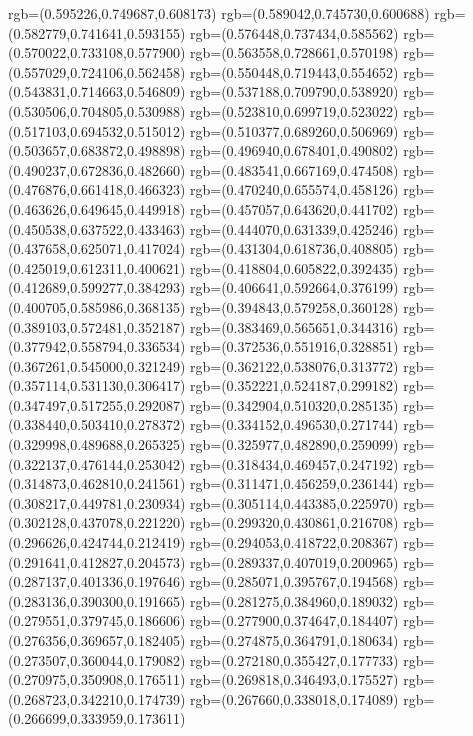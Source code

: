 {{{			rgb=(0.595226,0.749687,0.608173)
			rgb=(0.589042,0.745730,0.600688)
			rgb=(0.582779,0.741641,0.593155)
			rgb=(0.576448,0.737434,0.585562)
			rgb=(0.570022,0.733108,0.577900)
			rgb=(0.563558,0.728661,0.570198)
			rgb=(0.557029,0.724106,0.562458)
			rgb=(0.550448,0.719443,0.554652)
			rgb=(0.543831,0.714663,0.546809)
			rgb=(0.537188,0.709790,0.538920)
			rgb=(0.530506,0.704805,0.530988)
			rgb=(0.523810,0.699719,0.523022)
			rgb=(0.517103,0.694532,0.515012)
			rgb=(0.510377,0.689260,0.506969)
			rgb=(0.503657,0.683872,0.498898)
			rgb=(0.496940,0.678401,0.490802)
			rgb=(0.490237,0.672836,0.482660)
			rgb=(0.483541,0.667169,0.474508)
			rgb=(0.476876,0.661418,0.466323)
			rgb=(0.470240,0.655574,0.458126)
			rgb=(0.463626,0.649645,0.449918)
			rgb=(0.457057,0.643620,0.441702)
			rgb=(0.450538,0.637522,0.433463)
			rgb=(0.444070,0.631339,0.425246)
			rgb=(0.437658,0.625071,0.417024)
			rgb=(0.431304,0.618736,0.408805)
			rgb=(0.425019,0.612311,0.400621)
			rgb=(0.418804,0.605822,0.392435)
			rgb=(0.412689,0.599277,0.384293)
			rgb=(0.406641,0.592664,0.376199)
			rgb=(0.400705,0.585986,0.368135)
			rgb=(0.394843,0.579258,0.360128)
			rgb=(0.389103,0.572481,0.352187)
			rgb=(0.383469,0.565651,0.344316)
			rgb=(0.377942,0.558794,0.336534)
			rgb=(0.372536,0.551916,0.328851)
			rgb=(0.367261,0.545000,0.321249)
			rgb=(0.362122,0.538076,0.313772)
			rgb=(0.357114,0.531130,0.306417)
			rgb=(0.352221,0.524187,0.299182)
			rgb=(0.347497,0.517255,0.292087)
			rgb=(0.342904,0.510320,0.285135)
			rgb=(0.338440,0.503410,0.278372)
			rgb=(0.334152,0.496530,0.271744)
			rgb=(0.329998,0.489688,0.265325)
			rgb=(0.325977,0.482890,0.259099)
			rgb=(0.322137,0.476144,0.253042)
			rgb=(0.318434,0.469457,0.247192)
			rgb=(0.314873,0.462810,0.241561)
			rgb=(0.311471,0.456259,0.236144)
			rgb=(0.308217,0.449781,0.230934)
			rgb=(0.305114,0.443385,0.225970)
			rgb=(0.302128,0.437078,0.221220)
			rgb=(0.299320,0.430861,0.216708)
			rgb=(0.296626,0.424744,0.212419)
			rgb=(0.294053,0.418722,0.208367)
			rgb=(0.291641,0.412827,0.204573)
			rgb=(0.289337,0.407019,0.200965)
			rgb=(0.287137,0.401336,0.197646)
			rgb=(0.285071,0.395767,0.194568)
			rgb=(0.283136,0.390300,0.191665)
			rgb=(0.281275,0.384960,0.189032)
			rgb=(0.279551,0.379745,0.186606)
			rgb=(0.277900,0.374647,0.184407)
			rgb=(0.276356,0.369657,0.182405)
			rgb=(0.274875,0.364791,0.180634)
			rgb=(0.273507,0.360044,0.179082)
			rgb=(0.272180,0.355427,0.177733)
			rgb=(0.270975,0.350908,0.176511)
			rgb=(0.269818,0.346493,0.175527)
			rgb=(0.268723,0.342210,0.174739)
			rgb=(0.267660,0.338018,0.174089)
			rgb=(0.266699,0.333959,0.173611)
}}}
